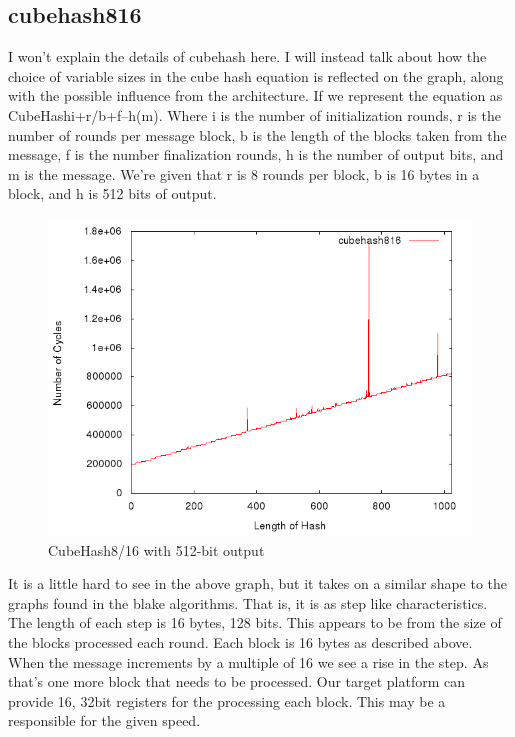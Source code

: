 \documentclass[10pt,a4paper]{article}
\begin{document}
\subsection{cubehash816}
I won't explain the details of cubehash here. I will instead talk about how the choice of variable sizes in the cube hash equation is reflected on the graph, along with the possible influence from the architecture. If we represent the equation as CubeHashi+r/b+f–h(m). Where i is the number of initialization rounds, r is the number of rounds per message block, b is the length of the blocks taken from the message, f is the number finalization rounds, h is the number of output bits, and m is the message. We're given that r is 8 rounds per block, b is 16 bytes in a block, and h is 512 bits of output.
    \begin{figure}[H]
        \begin{center}
            \includegraphics[scale=0.5]{images/cubehash816.png} 
            \caption{CubeHash8/16 with 512-bit output}
        \end{center}
    \end{figure}
It is a little hard to see in the above graph, but it takes on a similar shape to the graphs found in the blake algorithms. That is, it is as step like characteristics. The length of each step is 16 bytes, 128 bits. This appears to be from the size of the blocks processed each round. Each block is 16 bytes as described above. When the message increments by a multiple of 16 we see a rise in the step. As that's one more block that needs to be processed.  
Our target platform can provide 16, 32bit registers for the processing each block. This may be a responsible for the given speed.
\end{document}
